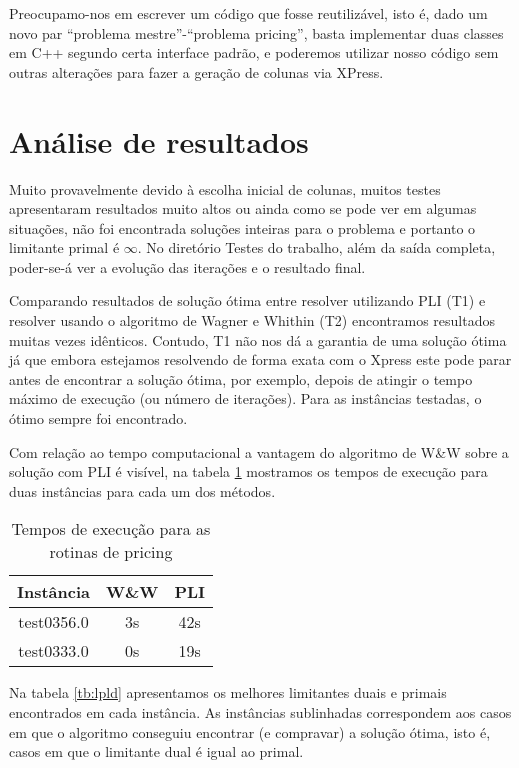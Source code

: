 \documentclass[letterpaper,11pt]{article}
\begin{document}
Preocupamo-nos em escrever um código que fosse reutilizável, isto é,
dado um novo par ``problema mestre''-``problema pricing'', basta
implementar duas classes em C++ segundo certa interface padrão, e
poderemos utilizar nosso código sem outras alterações para fazer a
geração de colunas via XPress.

\section{Análise de resultados}
Muito provavelmente devido à escolha inicial de colunas, muitos testes
apresentaram resultados muito altos ou ainda como se pode ver em
algumas situações, não foi encontrada soluções inteiras para o
problema e portanto o limitante primal é $\infty$. No diretório Testes
do trabalho, além da saída completa, poder-se-á ver a evolução das
iterações e o resultado final.

Comparando resultados de solução ótima entre resolver utilizando PLI
(T1) e resolver usando o algoritmo de Wagner e Whithin (T2)
encontramos resultados muitas vezes idênticos. Contudo, T1 não nos dá
a garantia de uma solução ótima já que embora estejamos resolvendo de
forma exata com o Xpress este pode parar antes de encontrar a solução
ótima, por exemplo, depois de atingir o tempo máximo de execução (ou
número de iterações). Para as instâncias testadas, o ótimo sempre foi
encontrado.

Com relação ao tempo computacional a vantagem do algoritmo de W\&W
sobre a solução com PLI é visível, na tabela \ref{tb:tempo} mostramos
os tempos de execução para duas instâncias para cada um dos métodos.

\begin{table}
  \centering
  \begin{tabular}{|c|c|c|}
    \hline
    Instância & W\&W & PLI \\
    \hline
    test0356.0 & 3s & 42s\\
    test0333.0 & 0s & 19s\\
    \hline
  \end{tabular}
  \caption{Tempos de execução para as rotinas de pricing}
  \label{tb:tempo}
\end{table}

Na tabela \ref{tb:lpld} apresentamos os melhores limitantes duais e
primais encontrados em cada instância. As instâncias sublinhadas
correspondem aos casos em que o algoritmo conseguiu encontrar (e
compravar) a solução ótima, isto é, casos em que o limitante dual é
igual ao primal.
\end{document}
